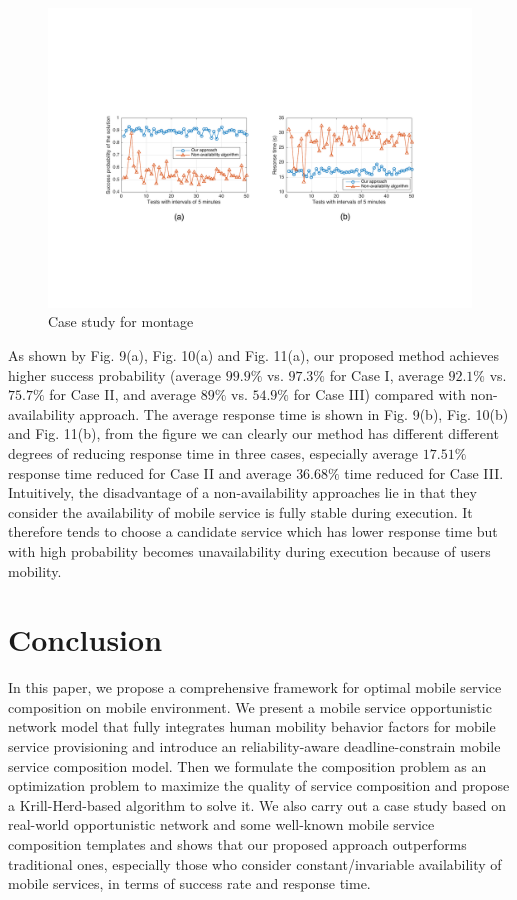 \documentclass[journal]{IEEEtran}
\begin{document}
\begin{figure}[!t]
\centering
\includegraphics[width=6in]{./img/Task-24.pdf}
\caption{Case study for montage}
\label{Task-24}
\end{figure}

As shown by Fig. 9(a), Fig. 10(a) and Fig. 11(a), our proposed method achieves higher success probability (average $99.9\%$ vs. $97.3\%$ for Case I, average $92.1\%$ vs. $75.7\%$ for Case II, and average $89\%$ vs. $54.9\%$ for Case III) compared with non-availability approach.
The average response time is shown in Fig. 9(b), Fig. 10(b) and Fig. 11(b), from the figure we can clearly our method has different different degrees of reducing response time in three cases, especially average $17.51\%$ response time reduced for Case II and average $36.68\%$ time reduced for Case III. Intuitively, the disadvantage of a non-availability approaches lie in that they consider the availability of mobile service is fully stable during execution. It therefore tends to choose a candidate service which has lower response time but with high probability becomes unavailability during execution because of users mobility.

\section{Conclusion}
In this paper, we propose a comprehensive framework for optimal mobile service composition on mobile environment. We present a mobile service opportunistic network model that fully integrates human mobility behavior factors for mobile service provisioning and introduce an reliability-aware deadline-constrain mobile service composition model. Then we formulate the composition problem as an optimization problem to maximize the quality of service composition and propose a Krill-Herd-based algorithm to solve it. We also carry out a case study based on real-world opportunistic network and some well-known mobile service composition templates and shows that our proposed approach outperforms traditional ones, especially those who consider constant/invariable availability of mobile services, in terms of success rate and response time.
\end{document}
